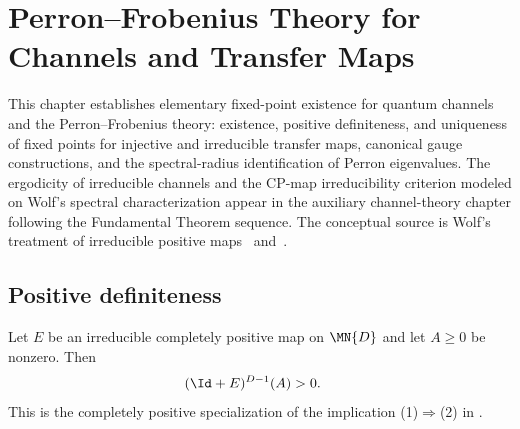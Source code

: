 \chapter{Perron--Frobenius Theory for Channels and Transfer Maps}\label{ch:qpf}

This chapter establishes elementary fixed-point existence for quantum channels
and the Perron--Frobenius theory: existence, positive definiteness, and uniqueness
of fixed points for injective and irreducible transfer maps, canonical
gauge constructions, and the
spectral-radius identification of Perron eigenvalues.
The ergodicity of irreducible channels and the CP-map
irreducibility criterion modeled on Wolf's spectral characterization appear in
the auxiliary channel-theory chapter following the Fundamental Theorem sequence.
The conceptual source is Wolf's treatment of irreducible positive
maps~\cite[Chapter~6, especially Theorems~6.2--6.5 and Corollary~6.3]{Wolf2012Quantum}
and~\cite{Evans1978Spectral}.






\section{Positive definiteness}

\begin{theorem}
    \label{thm:growth_pd_irred}
    \leanok
    Let $E$ be an irreducible completely positive map on $\MN{D}$ and let
    $A\geq0$ be nonzero. Then
    \begin{align}
        (\Id+E)^{D-1}(A)
         & >0.
        \label{eq:qpf_growth_pd}
    \end{align}
    This is the completely positive specialization of the implication
    (1)$\Rightarrow$(2) in \cite[Theorem~6.2]{Wolf2012Quantum}.
\end{theorem}

